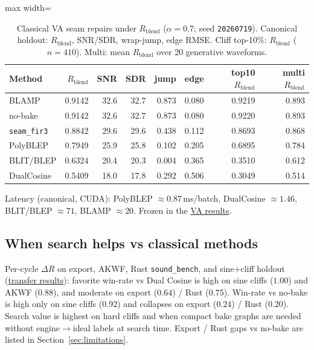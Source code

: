 \begin{table}[htbp]
  \centering
  \caption{Classical VA seam repairs under $R_{\mathrm{blend}}$ ($\alpha{=}0.7$; seed \texttt{20260719}).
  Canonical holdout: $R_{\mathrm{blend}}$, SNR/SDR, wrap-jump, edge RMSE.
  Cliff top-10\%: $R_{\mathrm{blend}}$ ($n{=}410$).
  Multi: mean $R_{\mathrm{blend}}$ over 20 generative waveforms.}
  \label{tab:va-seam-blep}
  \setlength{\tabcolsep}{2.5pt}
  \begin{adjustbox}{max width=\textwidth}
\begin{tabular}{@{}lrrrrrrr@{}}
    \toprule
    Method & $R_{\mathrm{blend}}$ & SNR & SDR & jump & edge & top10 $R_{\mathrm{blend}}$ & multi $R_{\mathrm{blend}}$ \\
    \midrule
    BLAMP & 0.9142 & 32.6 & 32.7 & 0.873 & 0.080 & 0.9219 & 0.893 \\
    no-bake & 0.9142 & 32.6 & 32.7 & 0.873 & 0.080 & 0.9220 & 0.893 \\
    \texttt{seam\_fir3} & 0.8842 & 29.6 & 29.6 & 0.438 & 0.112 & 0.8693 & 0.868 \\
    PolyBLEP & 0.7949 & 25.9 & 25.8 & 0.102 & 0.205 & 0.6895 & 0.784 \\
    BLIT/BLEP & 0.6324 & 20.4 & 20.3 & 0.004 & 0.365 & 0.3510 & 0.612 \\
    DualCosine & 0.5409 & 18.0 & 17.8 & 0.292 & 0.506 & 0.3049 & 0.514 \\
    \bottomrule
  \end{tabular}
\end{adjustbox}

  \vspace{0.5em}
  {\footnotesize Latency (canonical, CUDA): PolyBLEP $\approx 0.87$\,ms/batch, DualCosine $\approx 1.46$, BLIT/BLEP $\approx 71$, BLAMP $\approx 20$. Frozen in the \href{https://github.com/reeldemo/denoise-opt-meta/blob/master/paper/Unsupervised_Wrap-Discontinuity_Repair_in_Wavetable_Synthesis_via_Hybrid_GA-PPO_Meta-Search_v12/figures/va_seam_blep.json}{VA results}.}
  \vspace{1.0em}
\end{table}

\subsection{When search helps vs classical methods}
\label{sec:transfer}

Per-cycle $\Delta R$ on export, AKWF, Rust \texttt{sound\_bench}, and sine{+}cliff holdout
(\href{https://github.com/reeldemo/denoise-opt-meta/blob/master/paper/Unsupervised_Wrap-Discontinuity_Repair_in_Wavetable_Synthesis_via_Hybrid_GA-PPO_Meta-Search_v12/figures/transfer_failures.json}{transfer results}):
favorite win-rate vs Dual Cosine is high on sine cliffs ($1.00$) and AKWF ($0.88$), and moderate on export ($0.64$) / Rust ($0.75$).
Win-rate vs no-bake is high only on sine cliffs ($0.92$) and collapses on export ($0.24$) / Rust ($0.20$).
Search value is highest on hard cliffs and when compact bake graphs are needed without engine$\to$ideal labels at search time.
Export / Rust gaps vs no-bake are listed in Section~\ref{sec:limitations}.

